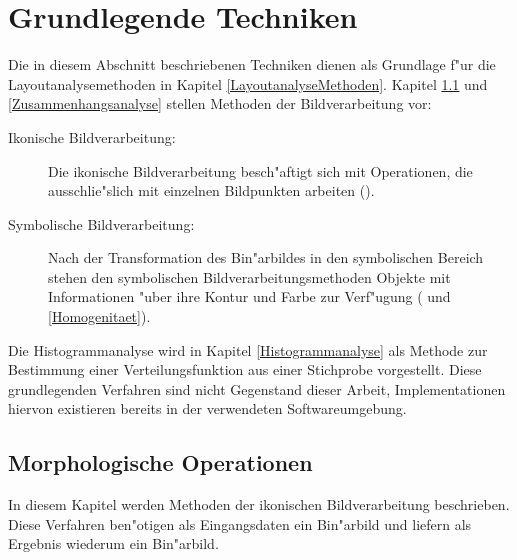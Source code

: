 \chapter{Grundlegende Techniken}
\label{GrundlegendeTechniken}

Die in diesem Abschnitt beschriebenen Techniken dienen als Grundlage f"ur die Layoutanalysemethoden 
in Kapitel \ref{LayoutanalyseMethoden}. Kapitel \ref{Morphologie} und \ref{Zusammenhangsanalyse}
stellen Methoden der Bildverarbeitung vor:

\begin{description}
  \item[Ikonische Bildverarbeitung:] Die ikonische Bildverarbeitung besch"aftigt sich mit 
  Operationen, die ausschlie"slich mit einzelnen Bildpunkten arbeiten ().

  \item[Symbolische Bildverarbeitung:] Nach der Transformation des Bin"arbildes in den
    symbolischen Bereich stehen den symbolischen Bildverarbeitungsmethoden Objekte
    mit Informationen "uber ihre Kontur und Farbe zur Verf"ugung
    ( und \ref{Homogenitaet}).
    
\end{description}
Die Histogrammanalyse wird in Kapitel \ref{Histogrammanalyse} als Methode zur Bestimmung einer
Verteilungsfunktion aus einer Stichprobe vorgestellt.  
Diese grundlegenden Verfahren sind nicht Gegenstand dieser Arbeit, Implementationen hiervon existieren bereits in der verwendeten Softwareumgebung.

\section{Morphologische Operationen}
\label{Morphologie}

In diesem Kapitel werden Methoden der ikonischen Bildverarbeitung beschrieben. Diese
Verfahren ben"otigen als Eingangsdaten ein Bin"arbild und liefern als Ergebnis
wiederum ein Bin"arbild. 


